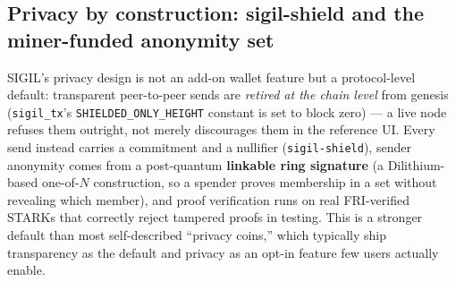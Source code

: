\begin{table}[h]
\centering
\small
{}
\caption{Consolidated evaluation. Each claim names its evidence \emph{kind}, following the same rule as the sister report: a claim without an executable, live-queried, or directly-observed proof is ``still pretend.''}
\label{tab:eval}
\end{table}

\subsection{Privacy by construction: sigil-shield and the miner-funded anonymity set}

SIGIL's privacy design is not an add-on wallet feature but a protocol-level default: transparent peer-to-peer sends are \emph{retired at the chain level} from genesis (\texttt{sigil\_tx}'s \texttt{SHIELDED\_ONLY\_HEIGHT} constant is set to block zero) --- a live node refuses them outright, not merely discourages them in the reference UI. Every send instead carries a commitment and a nullifier (\texttt{sigil-shield}), sender anonymity comes from a post-quantum \textbf{linkable ring signature} (a Dilithium-based one-of-$N$ construction, so a spender proves membership in a set without revealing which member), and proof verification runs on real FRI-verified STARKs that correctly reject tampered proofs in testing. This is a stronger default than most self-described ``privacy coins,'' which typically ship transparency as the default and privacy as an opt-in feature few users actually enable.

